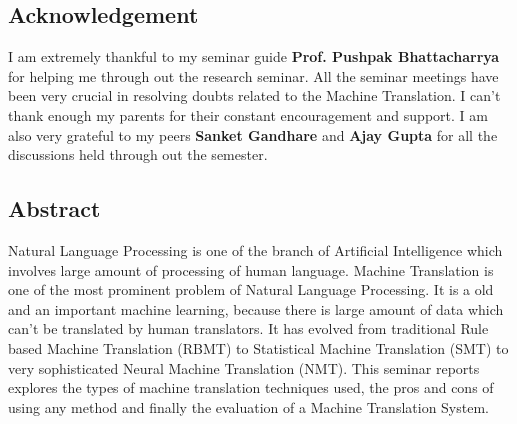 \documentclass[16pt,a4paper]{report}
\begin{document}
\newpage
\begin{center}
    \section*{\textbf{\LARGE Acknowledgement}}
    \justify
    I am extremely thankful to my seminar guide \textbf{Prof. Pushpak Bhattacharrya} for helping me through out the research seminar. All the seminar meetings have been very crucial in resolving doubts related to the Machine Translation. I can't thank enough my parents for their constant encouragement and support. I am also very grateful to my peers \textbf{Sanket Gandhare} and \textbf{Ajay Gupta} for all the discussions held through out the semester. 
\end{center}

\newpage
\begin{center}
    \section*{\textbf{\LARGE Abstract}}
    \justify
    Natural Language Processing is one of the branch of Artificial Intelligence which involves large amount of processing of human language. Machine Translation is one of the most prominent problem of Natural Language Processing. It is a old and an important machine learning, because there is large amount of data which can't be translated by human translators. It has evolved from traditional Rule based Machine Translation (RBMT) to Statistical Machine Translation (SMT) to very sophisticated Neural Machine Translation (NMT). This seminar reports explores the types of machine translation techniques used, the pros and cons of using any method and finally the evaluation of a Machine Translation System.
\end{center}
 


    \tableofcontents
    \newpage
    \listoffigures
    \newpage
    \listoftables
    \newpage
    
    
    
    
    
    
     
    
    
    
\end{document}

